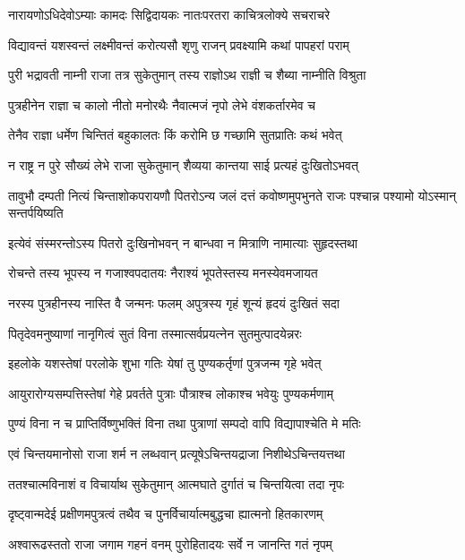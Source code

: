 \twolineshloka
{नारायणोऽधिदेवोऽम्याः कामदः सिद्विदायकः}
{नातःपरतरा काचित्रलोक्ये सचराचरे} %

\twolineshloka
{विद्यावन्तं यशस्वन्तं लक्ष्मीवन्तं करोत्यसौ}
{शृणु राजन् प्रवक्ष्यामि कथां पापहरां पराम्} %

\twolineshloka
{पुरी भद्रावती नाम्नी राजा तत्र सुकेतुमान्}
{तस्य राज्ञोऽथ राज्ञी च शैब्या नाम्नीति विश्रुता} %

\twolineshloka
{पुत्रहीनेन राज्ञा च कालो नीतो मनोरथैः}
{नैवात्मजं नृपो लेभे वंशकर्तारमेव च} %

\twolineshloka
{तेनैव राज्ञा धर्मेण चिन्तितं बहुकालतः}
{किं करोमि छ गच्छामि सुतप्रातिः कथं भवेत्} %

\twolineshloka
{न राष्ट्र न पुरे सौख्यं लेभे राजा सुकेतुमान्}
{शैव्यया कान्तया साई प्रत्यहं दुःखितोऽभवत्} %


\threelineshloka
{तावुभौ दम्पती नित्यं चिन्ताशोकपरायणौ}
{पितरोऽन्य जलं दत्तं कवोष्णमुपभुनते}
{राजः पश्चान्न पश्यामो योऽस्मान् सन्तर्पयिष्यति} %

\twolineshloka
{इत्येवं संस्मरन्तोऽस्य पितरो दुःखिनोभवन्}
{न बान्धवा न मित्राणि नामात्याः सुहृदस्तथा} %

\twolineshloka
{रोचन्ते तस्य भूपस्य न गजाश्वपदातयः}
{नैराश्यं भूपतेस्तस्य मनस्येवमजायत} %

\twolineshloka
{नरस्य पुत्रहीनस्य नास्ति वै जन्मनः फलम्}
{अपुत्रस्य गृहं शून्यं हृदयं दुःखितं सदा} %

\twolineshloka
{पितृदेवमनुष्याणां नानृगित्वं सुतं विना}
{तस्मात्सर्वप्रयत्नेन सुतमुत्पादयेन्नरः} %

\twolineshloka
{इहलोके यशस्तेषां परलोके शुभा गतिः}
{येषां तु पुण्यकर्तृणां पुत्रजन्म गृहे भवेत्} %

\twolineshloka
{आयुरारोग्यसम्पत्तिस्तेषां गेहे प्रवर्तते}
{पुत्राः पौत्राश्च लोकाश्च भवेयुः पुण्यकर्मणाम्} %

\twolineshloka
{पुण्यं विना न च प्राप्तिर्विष्णुभक्तिं विना तथा}
{पुत्राणां सम्पदो वापि विद्यापाश्चेति मे मतिः} %

\twolineshloka
{एवं चिन्तयमानोसो राजा शर्म न लब्धवान्}
{प्रत्यूषेऽचिन्तयद्राजा निशीथेऽचिन्तयत्तथा} %

\twolineshloka
{ततश्चात्मविनाशं व विचार्याथ सुकेतुमान्}
{आत्मघाते दुर्गातं च चिन्तयित्वा तदा नृपः} %

\twolineshloka
{दृष्ट्वान्मदेई प्रक्षीणमपुत्रत्वं तथैव च}
{पुनर्विचार्यात्मबुद्धचा ह्यात्मनो हितकारणम्} %

\twolineshloka
{अश्वारूढस्ततो राजा जगाम गहनं वनम्}
{पुरोहितादयः सर्वे न जानन्ति गतं नृपम्} %

